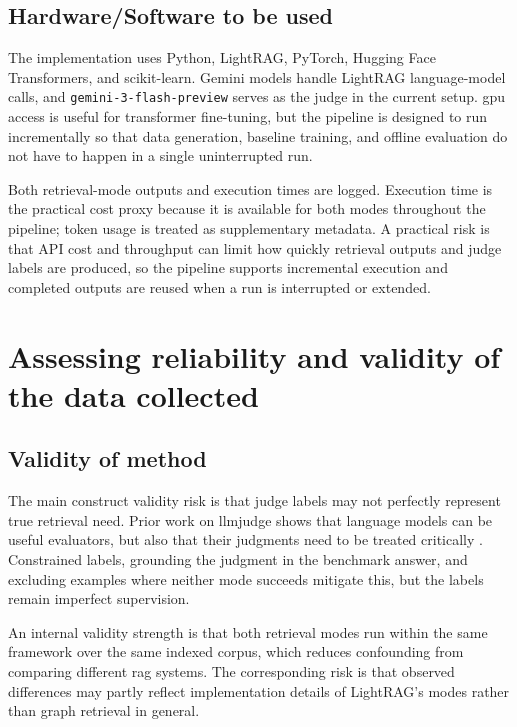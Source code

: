 \documentclass[english, bibtex]{kththesis}               %
\numberwithin{listing}{chapter}
\begin{document}
\subsection{Hardware/Software to be used}
\label{sec:hardwareSoftware}

The implementation uses Python, LightRAG, PyTorch, Hugging Face Transformers, and scikit-learn. Gemini models handle LightRAG language-model calls, and \texttt{gemini-3-flash-preview} serves as the judge in the current setup. \Gls{gpu} access is useful for transformer fine-tuning, but the pipeline is designed to run incrementally so that data generation, baseline training, and offline evaluation do not have to happen in a single uninterrupted run.

Both retrieval-mode outputs and execution times are logged. Execution time is the practical cost proxy because it is available for both modes throughout the pipeline; token usage is treated as supplementary metadata. A practical risk is that \gls{API} cost and throughput can limit how quickly retrieval outputs and judge labels are produced, so the pipeline supports incremental execution and completed outputs are reused when a run is interrupted or extended.

\section{Assessing reliability and validity of the data collected}
\label{sec:assessingReliability}

\subsection{Validity of method}
\label{sec:validtyOfMethod}

The main construct validity risk is that judge labels may not perfectly represent true retrieval need. Prior work on \gls{llmjudge} shows that language models can be useful evaluators, but also that their judgments need to be treated critically \cite{zheng2023judge}. Constrained labels, grounding the judgment in the benchmark answer, and excluding examples where neither mode succeeds mitigate this, but the labels remain imperfect supervision.

An internal validity strength is that both retrieval modes run within the same framework over the same indexed corpus, which reduces confounding from comparing different \gls{rag} systems. The corresponding risk is that observed differences may partly reflect implementation details of LightRAG's modes rather than graph retrieval in general.
\end{document}
